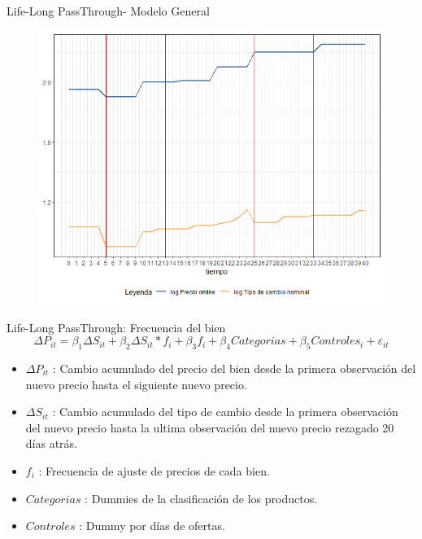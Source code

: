 \documentclass[xcolor=dvipsnames]{beamer}
\begin{document}
\begin{frame}
Life-Long PassThrough- Modelo General
\begin{figure}
\includegraphics[scale=0.45]{metodologia.png}
\end{figure}
\end{frame}

\begin{frame}
Life-Long PassThrough: Frecuencia del bien
\begin{equation}
\Delta P_{it} = \beta_{1} \Delta S_{it}  + \beta_{2} \Delta S_{it}*f_{i} + \beta_{3}f_{i} + \beta_{4}Categorias + \beta_{5}Controles_{i} + \varepsilon_{it}
\end{equation}
\begin{itemize}
	\item $\Delta P_{it}$ : Cambio acumulado del precio del bien desde la primera observaci\'on del nuevo precio hasta el siguiente nuevo precio.
	\item $\Delta S_{it}$ : Cambio acumulado del tipo de cambio desde la primera observaci\'on del nuevo precio hasta la ultima observaci\'on del nuevo precio rezagado 20 d\'ias atr\'as.
	\item $f_{i}$ : Frecuencia de ajuste de precios de cada bien.
	\item $Categorias$ : Dummies de la clasificaci\'on de los productos.
	\item $Controles$ :  Dummy por d\'ias de ofertas.
\end{itemize}
\end{frame}
\end{document}
